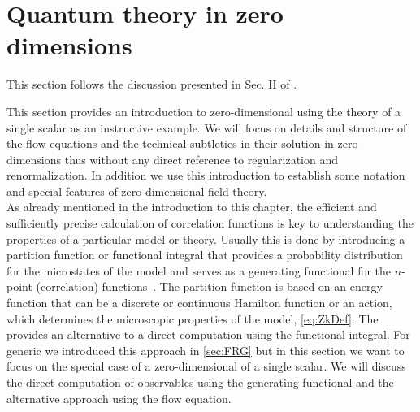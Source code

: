 \section{Quantum \texorpdfstring{}{(field)} theory in zero dimensions}\label{sec:0dQFT}
\begin{disclaimer}
	This section follows the discussion presented in Sec. II of .
\end{disclaimer}
This section provides an introduction to zero-dimensional \qft{} using the theory of a single scalar as an instructive example.
We will focus on details and structure of the flow equations and the technical subtleties in their solution in zero dimensions thus without any direct reference to regularization and renormalization.
In addition we use this introduction to establish some notation and special features of zero-dimensional field theory.\\

As already mentioned in the introduction to this chapter, the efficient and sufficiently precise calculation of correlation functions is key to understanding the properties of a particular model or theory.
Usually this is done by introducing a partition function or functional integral that provides a probability distribution for the microstates of the model and serves as a generating functional for the $n$-point (correlation) functions~\cite{Weinberg:1996kr,Peskin:1995ev,ZinnJustin:2002ru,Kleinert:2004ev}.
The partition function is based on an energy function that can be a discrete or continuous Hamilton function or an action, which determines the microscopic properties of the model, \cf{} \cref{eq:ZkDef}.
The \frg{} provides an alternative to a direct computation using the functional integral.
For generic \qfts{} we introduced this approach in \cref{sec:FRG} but in this section we want to focus on the special case of a zero-dimensional \qft{} of a single scalar.
We will discuss the direct computation of observables using the generating functional and the alternative approach using the \frg{} flow equation.

